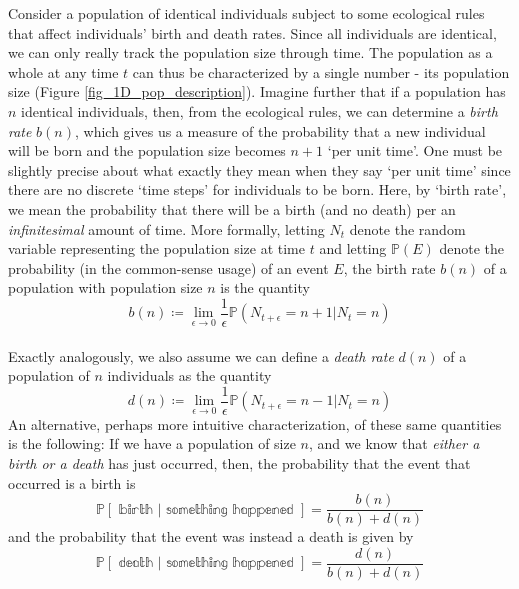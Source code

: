Consider a population of identical individuals subject to some ecological rules that affect individuals' birth and death rates. Since all individuals are identical, we can only really track the population size through time. The population as a whole at any time $t$ can thus be characterized by a single number - its population size (Figure \ref{fig_1D_pop_description}). Imagine further that if a population has $n$ identical individuals, then, from the ecological rules, we can determine a \emph{birth rate} $b(n)$, which gives us a measure of the probability that a new individual will be born and the population size becomes $n+1$ `per unit time'. One must be slightly precise about what exactly they mean when they say `per unit time' since there are no discrete `time steps' for individuals to be born. Here, by `birth rate', we mean the probability that there will be a birth (and no death) per an \emph{infinitesimal} amount of time. More formally, letting $N_t$ denote the random variable representing the population size at time $t$ and letting $\mathbb{P}(E)$ denote the probability (in the common-sense usage) of an event $E$, the birth rate $b(n)$ of a population with population size $n$ is the quantity
\begin{equation}
\label{1D_birthrate_defn}
b(n) \coloneqq \lim_{\epsilon \to 0}\frac{1}{\epsilon}\mathbb{P}\left(N_{t+\epsilon}=n+1 | N_{t}=n\right)
\end{equation}
\\

Exactly analogously, we also assume we can define a \emph{death rate} $d(n)$ of a population of $n$ individuals as the quantity
\begin{equation}
\label{1D_deathrate_defn}
d(n) \coloneqq \lim_{\epsilon \to 0}\frac{1}{\epsilon}\mathbb{P}\left(N_{t+\epsilon}=n-1 | N_{t}=n\right)
\end{equation}
An alternative, perhaps more intuitive characterization, of these same quantities is the following: If we have a population of size $n$, and we know that \emph{either a birth or a death} has just occurred, then, the probability that the event that occurred is a birth is
\begin{equation*}
    \mathbb{P[\textrm{ birth } | \textrm{ something happened }]} = \frac{b(n)}{b(n)+d(n)}
\end{equation*}
and the probability that the event was instead a death is given by
\begin{equation*}
    \mathbb{P[\textrm{ death } | \textrm{ something happened }]} = \frac{d(n)}{b(n)+d(n)}
\end{equation*}
\\

